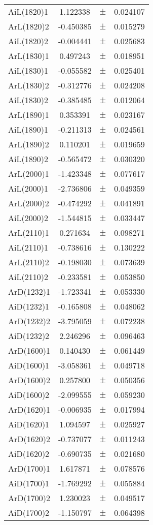 \begin{table}
\begin{tiny}
\begin{tabular}{lccc}
AiL(1820)1 & 1.122338 & $\pm$ & 0.024107 \\
ArL(1820)2 & -0.450385 & $\pm$ & 0.015279 \\
AiL(1820)2 & -0.004441 & $\pm$ & 0.025683 \\
ArL(1830)1 & 0.497243 & $\pm$ & 0.018951 \\
AiL(1830)1 & -0.055582 & $\pm$ & 0.025401 \\
ArL(1830)2 & -0.312776 & $\pm$ & 0.024208 \\
AiL(1830)2 & -0.385485 & $\pm$ & 0.012064 \\
ArL(1890)1 & 0.353391 & $\pm$ & 0.023167 \\
AiL(1890)1 & -0.211313 & $\pm$ & 0.024561 \\
ArL(1890)2 & 0.110201 & $\pm$ & 0.019659 \\
AiL(1890)2 & -0.565472 & $\pm$ & 0.030320 \\
ArL(2000)1 & -1.423348 & $\pm$ & 0.077617 \\
AiL(2000)1 & -2.736806 & $\pm$ & 0.049359 \\
ArL(2000)2 & -0.474292 & $\pm$ & 0.041891 \\
AiL(2000)2 & -1.544815 & $\pm$ & 0.033447 \\
ArL(2110)1 & 0.271634 & $\pm$ & 0.098271 \\
AiL(2110)1 & -0.738616 & $\pm$ & 0.130222 \\
ArL(2110)2 & -0.198030 & $\pm$ & 0.073639 \\
AiL(2110)2 & -0.233581 & $\pm$ & 0.053850 \\
ArD(1232)1 & -1.723341 & $\pm$ & 0.053330 \\
AiD(1232)1 & -0.165808 & $\pm$ & 0.048062 \\
ArD(1232)2 & -3.795059 & $\pm$ & 0.072238 \\
AiD(1232)2 & 2.246296 & $\pm$ & 0.096463 \\
ArD(1600)1 & 0.140430 & $\pm$ & 0.061449 \\
AiD(1600)1 & -3.058361 & $\pm$ & 0.049718 \\
ArD(1600)2 & 0.257800 & $\pm$ & 0.050356 \\
AiD(1600)2 & -2.099555 & $\pm$ & 0.059230 \\
ArD(1620)1 & -0.006935 & $\pm$ & 0.017994 \\
AiD(1620)1 & 1.094597 & $\pm$ & 0.025927 \\
ArD(1620)2 & -0.737077 & $\pm$ & 0.011243 \\
AiD(1620)2 & -0.690735 & $\pm$ & 0.021680 \\
ArD(1700)1 & 1.617871 & $\pm$ & 0.078576 \\
AiD(1700)1 & -1.769292 & $\pm$ & 0.055884 \\
ArD(1700)2 & 1.230023 & $\pm$ & 0.049517 \\
AiD(1700)2 & -1.150797 & $\pm$ & 0.064398 \\
\bottomrule
\end{tabular}
\end{tiny}
\end{table}

